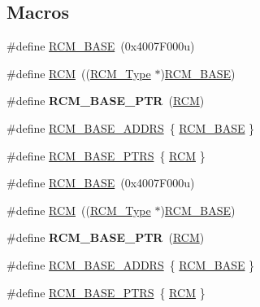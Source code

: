 \subsection*{Macros}
\begin{DoxyCompactItemize}
\item 
\#define \hyperlink{group__RCM__Peripheral__Access__Layer_ga0f155ee1b03b8a20749da74c4f19d34d}{R\+C\+M\+\_\+\+B\+A\+SE}~(0x4007\+F000u)
\item 
\#define \hyperlink{group__RCM__Peripheral__Access__Layer_gaa5c5e6af3b266654facbd52caa0b8874}{R\+CM}~((\hyperlink{structRCM__Type}{R\+C\+M\+\_\+\+Type} $\ast$)\hyperlink{group__RCM__Peripheral__Access__Layer_ga0f155ee1b03b8a20749da74c4f19d34d}{R\+C\+M\+\_\+\+B\+A\+SE})
\item 
\#define {\bfseries R\+C\+M\+\_\+\+B\+A\+S\+E\+\_\+\+P\+TR}~(\hyperlink{group__RCM__Peripheral__Access__Layer_gaa5c5e6af3b266654facbd52caa0b8874}{R\+CM})\hypertarget{group__RCM__Peripheral__Access__Layer_ga25ab3aa8d593d455ed36a52c77f88234}{}\label{group__RCM__Peripheral__Access__Layer_ga25ab3aa8d593d455ed36a52c77f88234}

\item 
\#define \hyperlink{group__RCM__Peripheral__Access__Layer_gaf3db57eb66e9dc48fcac7ebf4e6884c6}{R\+C\+M\+\_\+\+B\+A\+S\+E\+\_\+\+A\+D\+D\+RS}~\{ \hyperlink{group__RCM__Peripheral__Access__Layer_ga0f155ee1b03b8a20749da74c4f19d34d}{R\+C\+M\+\_\+\+B\+A\+SE} \}
\item 
\#define \hyperlink{group__RCM__Peripheral__Access__Layer_gad8549fec4a09b0b485983beadfc3a5fb}{R\+C\+M\+\_\+\+B\+A\+S\+E\+\_\+\+P\+T\+RS}~\{ \hyperlink{group__RCM__Peripheral__Access__Layer_gaa5c5e6af3b266654facbd52caa0b8874}{R\+CM} \}
\item 
\#define \hyperlink{group__RCM__Peripheral__Access__Layer_ga0f155ee1b03b8a20749da74c4f19d34d}{R\+C\+M\+\_\+\+B\+A\+SE}~(0x4007\+F000u)
\item 
\#define \hyperlink{group__RCM__Peripheral__Access__Layer_gaa5c5e6af3b266654facbd52caa0b8874}{R\+CM}~((\hyperlink{structRCM__Type}{R\+C\+M\+\_\+\+Type} $\ast$)\hyperlink{group__RCM__Peripheral__Access__Layer_ga0f155ee1b03b8a20749da74c4f19d34d}{R\+C\+M\+\_\+\+B\+A\+SE})
\item 
\#define {\bfseries R\+C\+M\+\_\+\+B\+A\+S\+E\+\_\+\+P\+TR}~(\hyperlink{group__RCM__Peripheral__Access__Layer_gaa5c5e6af3b266654facbd52caa0b8874}{R\+CM})\hypertarget{group__RCM__Peripheral__Access__Layer_ga25ab3aa8d593d455ed36a52c77f88234}{}\label{group__RCM__Peripheral__Access__Layer_ga25ab3aa8d593d455ed36a52c77f88234}

\item 
\#define \hyperlink{group__RCM__Peripheral__Access__Layer_gaf3db57eb66e9dc48fcac7ebf4e6884c6}{R\+C\+M\+\_\+\+B\+A\+S\+E\+\_\+\+A\+D\+D\+RS}~\{ \hyperlink{group__RCM__Peripheral__Access__Layer_ga0f155ee1b03b8a20749da74c4f19d34d}{R\+C\+M\+\_\+\+B\+A\+SE} \}
\item 
\#define \hyperlink{group__RCM__Peripheral__Access__Layer_gad8549fec4a09b0b485983beadfc3a5fb}{R\+C\+M\+\_\+\+B\+A\+S\+E\+\_\+\+P\+T\+RS}~\{ \hyperlink{group__RCM__Peripheral__Access__Layer_gaa5c5e6af3b266654facbd52caa0b8874}{R\+CM} \}
\end{DoxyCompactItemize}
